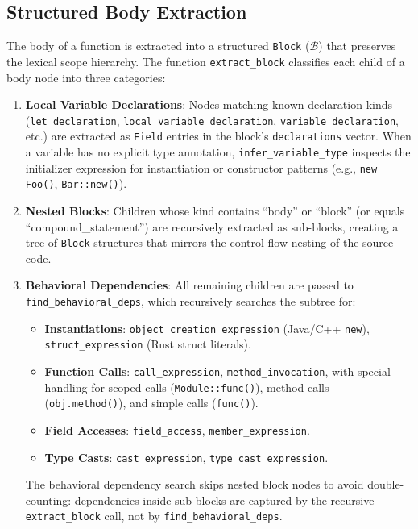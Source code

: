 \subsection{Structured Body Extraction}
\label{sec:body_extraction}

The body of a function is extracted into a structured \texttt{Block} ($\mathcal{B}$) that preserves the lexical scope hierarchy. The function \texttt{extract\_block} classifies each child of a body node into three categories:

\begin{enumerate}
  \item \textbf{Local Variable Declarations}: Nodes matching known declaration kinds (\texttt{let\_declaration}, \texttt{local\_variable\_declaration}, \texttt{variable\_declaration}, etc.) are extracted as \texttt{Field} entries in the block's \texttt{declarations} vector. When a variable has no explicit type annotation, \texttt{infer\_variable\_type} inspects the initializer expression for instantiation or constructor patterns (e.g., \texttt{new Foo()}, \texttt{Bar::new()}).
  \item \textbf{Nested Blocks}: Children whose kind contains ``body'' or ``block'' (or equals ``compound\_statement'') are recursively extracted as sub-blocks, creating a tree of \texttt{Block} structures that mirrors the control-flow nesting of the source code.
  \item \textbf{Behavioral Dependencies}: All remaining children are passed to \texttt{find\_behavioral\_deps}, which recursively searches the subtree for:
    \begin{itemize}
      \item \textbf{Instantiations}: \texttt{object\_creation\_expression} (Java/C++ \texttt{new}), \texttt{struct\_expression} (Rust struct literals).
      \item \textbf{Function Calls}: \texttt{call\_expression}, \texttt{method\_invocation}, with special handling for scoped calls (\texttt{Module::func()}), method calls (\texttt{obj.method()}), and simple calls (\texttt{func()}).
      \item \textbf{Field Accesses}: \texttt{field\_access}, \texttt{member\_expression}.
      \item \textbf{Type Casts}: \texttt{cast\_expression}, \texttt{type\_cast\_expression}.
    \end{itemize}
    The behavioral dependency search skips nested block nodes to avoid double-counting: dependencies inside sub-blocks are captured by the recursive \texttt{extract\_block} call, not by \texttt{find\_behavioral\_deps}.
\end{enumerate}

